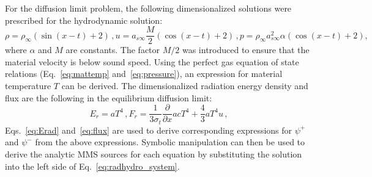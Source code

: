 \documentclass[preprint,12pt]{elsarticle}
\newcommand{\dxdy}[2]{\frac{\partial #1}{\partial #2}}
\newcommand{\pec}{\, ,}
\newcommand{\E}{{E_r}}
\newcommand{\F}{{F_r}}
\begin{document}
For the diffusion limit problem, the following dimensionalized solutions were prescribed for the hydrodynamic solution:
\begin{subequations}
   \begin{equation} 
      \rho = \rho_{\infty}\left(\sin(x - t) + 2\right) \pec
   \end{equation} 
   \begin{equation}
       u = {a_{s\infty}}\frac{M}{2}\left(\cos(x - t) + 2\right) \pec 
   \end{equation} 
   \begin{equation} 
       p = \rho_\infty a_{s\infty}^2 \alpha\left(\cos(x - t) + 2\right) ,
   \end{equation}
\end{subequations}
where $\alpha$ and $M$ are constants.  The factor $M/2$ was introduced to ensure
that the material velocity is below sound speed.
Using the perfect gas equation of state relations (Eq.~\eqref{eq:mattemp} and~\eqref{eq:pressure}), an expression for material temperature $T$ can be derived.
 The dimensionalized radiation energy density and flux are the following in the equilibrium diffusion limit:
\begin{subequations}
   \begin{equation} 
     \E = aT^4 \pec
   \end{equation}
   \begin{equation} 
       \F = \frac{1}{3\sigma_t}\dxdy{}{x} a c T^4 +
\frac{4}{3} a T^4u 
\pec \end{equation} 
\end{subequations}
Eqs.~\eqref{eq:Erad} and~\eqref{eq:flux} are used to derive corresponding expressions for $\psi^+$ and $\psi^-$ from the above expressions.
Symbolic manipulation can then be used to derive the analytic MMS sources for each equation by substituting the solution into the left side
of Eq.~\eqref{eq:radhydro_system}.
\end{document}
